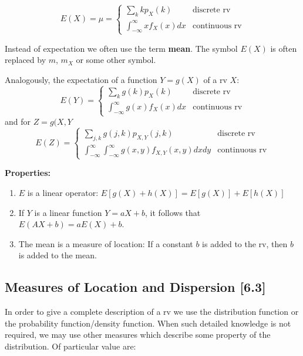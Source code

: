 \documentclass[a4paper,9pt]{extarticle}
\begin{document}
\begin{multicols*}{2}
\begin{equation}
    E(X) = \mu = \begin{cases}
        \sum_k k p_X(k) & \text{discrete rv} \\
        \int_{-\infty}^{\infty} x f_X(x) dx & \text{continuous rv}
    \end{cases}
\end{equation}

Instead of expectation we often use the term \textbf{mean}. The symbol $E(X)$ is often replaced by $m$, $m_X$ or some other symbol.

Analogously, the expectation of a function $Y = g(X)$ of a rv $X$:
\begin{equation}
    E(Y) = \begin{cases}
        \sum_k g(k) p_X(k) & \text{discrete rv} \\
        \int_{-\infty}^{\infty} g(x) f_X(x) dx & \text{continuous rv}
    \end{cases}
\end{equation}
and for $Z = g(X, Y$
\begin{equation}
    E(Z) = \begin{cases}
        \sum_{j,k} g(j,k) p_{X,Y}(j,k) & \text{discrete rv} \\
        \int_{-\infty}^{\infty} \int_{-\infty}^{\infty} g(x,y) f_{X,Y}(x,y) dx dy & \text{continuous rv}
    \end{cases}
\end{equation}

\textbf{Properties:}
\begin{enumerate}[label=\bfseries (\arabic*)] \itemsep0pt \parskip0pt
    \item $E$ is a linear operator: $E[g(X) + h(X)] = E[g(X)] + E[h(X)]$
    \item If $Y$ is a linear function $Y = a X + b$, it follows that $E(A X + b) = a E(X) + b$.
    \item The mean is a measure of location: If a constant $b$ is added to the rv, then $b$ is added to the mean.
\end{enumerate}

\subsection{Measures of Location and Dispersion [6.3]}
In order to give a complete description of a rv we use the distribution function or the probability function/density function. When such detailed knowledge is not required, we may use other measures which describe some property of the distribution. Of particular value are:


\end{multicols*}
\end{document}
